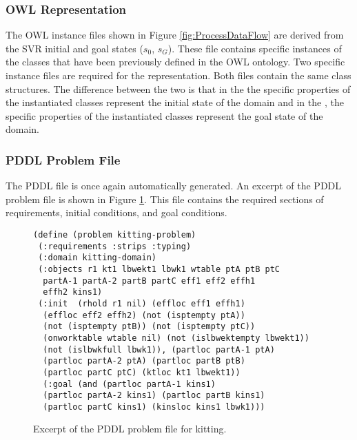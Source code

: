 \subsubsection{OWL Representation}
The OWL instance files shown in Figure \ref{fig:ProcessDataFlow} are derived from the SVR initial and goal states ($s_0$, $s_G$). These file contains
specific instances of the classes that have been previously defined in the OWL ontology. Two specific instance files are required for the representation.
Both files contain the same class structures. The difference between the two is that in the  the specific properties of the instantiated
classes represent the initial state of the domain and in the , the specific properties of the instantiated classes represent the goal state
of the domain.
\subsubsection{PDDL Problem File}
The PDDL file is once again automatically generated. An excerpt of the PDDL problem file is shown in Figure \ref{fig:problemfile}. This file
contains the required sections of requirements, initial conditions, and goal conditions.

\begin{figure}[h!]
\begin{center}
\begin{minipage}{.5\paperwidth}
\begin{mylisting}
\begin{Verbatim}[commandchars=\\\{\},commandchars=+\[\],fontsize=\scriptsize,numbersep=3pt]
(define (problem kitting-problem)
 (:requirements :strips :typing)
 (:domain kitting-domain)
 (:objects r1 kt1 lbwekt1 lbwk1 wtable ptA ptB ptC
  partA-1 partA-2 partB partC eff1 eff2 effh1
  effh2 kins1)
 (:init  (rhold r1 nil) (effloc eff1 effh1)
  (effloc eff2 effh2) (not (isptempty ptA))
  (not (isptempty ptB)) (not (isptempty ptC))
  (onworktable wtable nil) (not (islbwektempty lbwekt1))
  (not (islbwkfull lbwk1)), (partloc partA-1 ptA)
  (partloc partA-2 ptA) (partloc partB ptB)
  (partloc partC ptC) (ktloc kt1 lbwekt1))
  (:goal (and (partloc partA-1 kins1)
  (partloc partA-2 kins1) (partloc partB kins1)
  (partloc partC kins1) (kinsloc kins1 lbwk1)))
\end{Verbatim}
\end{mylisting}
\end{minipage}
\caption{Excerpt of the PDDL problem file for kitting.\label{fig:problemfile}}
\end{center}
\end{figure}


